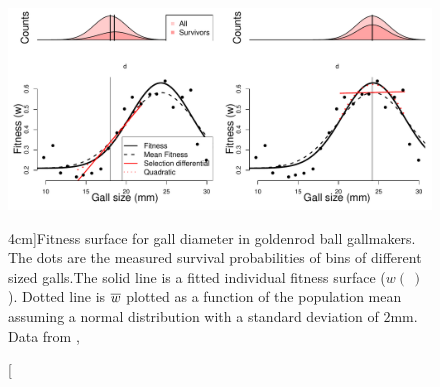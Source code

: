 \begin{figure}
\begin{center}
\includegraphics[width= \textwidth]{Journal_figs/Quant_gen/Weis_Gorman_gall_size_stablizing_sel/gall_size.pdf}
\end{center}
\caption[][4cm]{Fitness surface for gall diameter in goldenrod
ball gallmakers. The dots are the measured survival probabilities of
bins of different sized galls.The solid line is a fitted individual fitness
  surface ($w(~)$). Dotted line is $\overline{w}$ plotted as a function of
  the population mean assuming a normal distribution with a standard
  deviation of $2$mm. Data from \citet{weis1990measuring}, } \label{gall_size_stab}
\end{figure}




 


 
